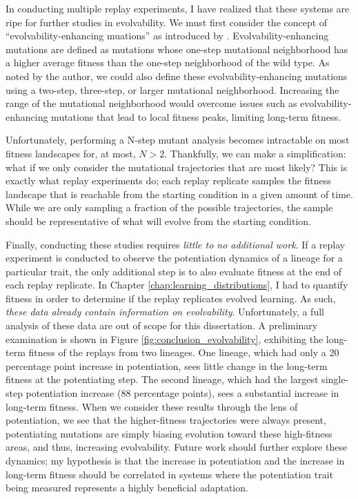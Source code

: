 In conducting multiple replay experiments, I have realized that these systems are ripe for further studies in evolvability. 
We must first consider the concept of ``evolvability-enhancing muations'' as introduced by \citep{wagnerEvolvabilityenhancingMutationsFitness2023}. 
Evolvability-enhancing mutations are defined as mutations whose one-step mutational neighborhood has a higher average fitness than the one-step neighborhood of the wild type.
As noted by the author, we could also define these evolvability-enhancing mutations using a two-step, three-step, or larger mutational neighborhood. 
Increasing the range of the mutational neighborhood would overcome issues such as evolvability-enhancing mutations that lead to local fitness peaks, limiting long-term fitness.

Unfortunately, performing a N-step mutant analysis becomes intractable on most fitness landscapes for, at most, $N > 2$.
Thankfully, we can make a simplification: what if we only consider the mutational trajectories that are most likely? 
This is exactly what replay experiments do; each replay replicate samples the fitness landscape that is reachable from the starting condition in a given amount of time.
While we are only sampling a fraction of the possible trajectories, the sample should be representative of what will evolve from the starting condition. 


Finally, conducting these studies requires \textit{little to no additional work}.
If a replay experiment is conducted to observe the potentiation dynamics of a lineage for a particular trait, the only additional step is to also evaluate fitness at the end of each replay replicate. 
In Chapter \ref{chap:learning_distributions}, I had to quantify fitness in order to determine if the replay replicates evolved learning. 
As such, \textit{these data already contain information on evolvability}.
Unfortunately, a full analysis of these data are out of scope for this dissertation. 
A preliminary examination is shown in Figure \ref{fig:conclusion_evolvability}, exhibiting the long-term fitness of the replays from two lineages. 
One lineage, which had only a 20 percentage point increase in potentiation, sees little change in the long-term fitness at the potentiating step. 
The second lineage, which had the largest single-step potentiation increase (88 percentage points), sees a substantial increase in long-term fitness. 
When we consider these results through the lens of potentiation, we see that the higher-fitness trajectories were always present, potentiating mutations are simply biasing evolution toward these high-fitness areas, and thus, increasing evolvability. 
Future work should further explore these dynamics; my hypothesis is that the increase in potentiation and the increase in long-term fitness should be correlated in systems where the potentiation trait being measured represents a highly beneficial adaptation. 